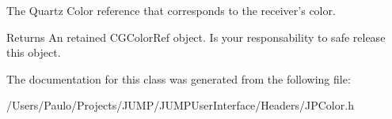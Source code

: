 The Quartz Color reference that corresponds to the receiver’s color. 

\begin{DoxyReturn}{Returns}
An retained CGColorRef object. Is your responsability to safe release this object. 
\end{DoxyReturn}


The documentation for this class was generated from the following file:\begin{DoxyCompactItemize}
\item 
/Users/Paulo/Projects/JUMP/JUMPUserInterface/Headers/JPColor.h\end{DoxyCompactItemize}
